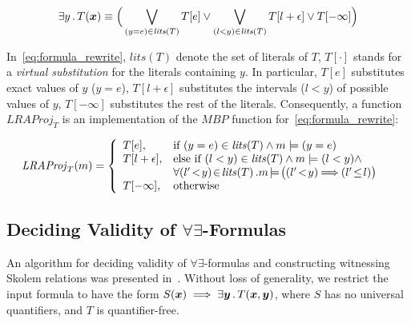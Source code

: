 \begin{equation}
  \exists y \such T (\vx) \equiv \Big( \Lor_{(y = e) \in \mathit{lits}(T)}{T[e]} \lor
  	\Lor_{(l < y) \in \mathit{lits} (T)}{T [l + \epsilon]} \lor
	T[-\infty] \Big)\label{eq:formula_rewrite}
\end{equation} 
\smallskip  

In~\eqref{eq:formula_rewrite}, $\mathit{lits}(T)$ denote the set of literals of $T$, $T[\cdot]$ stands for a \emph{virtual substitution} for the literals containing $y$.
In particular, $T[e]$ substitutes exact values of $y$ ($y=e$), $T[l+\epsilon]$ substitutes the intervals ($l < y$) of possible values of $y$, $T[-\infty]$ substitutes the rest of the literals.
Consequently, a function $\mathit{LRAProj_{T}}$ is an implementation of the $\mathit{MBP}$ function for~\eqref{eq:formula_rewrite}:

\begin{equation}
\begin{aligned}
\label{case:proj_define}
&\mathit{LRAProj}_{T}(m) = \left\{
\begin{array}{ll}
T[e], 			& \mbox{if}\ (y=e) \in \mathit{lits}(T) \land 
			m \models (y = e)\\
T[l+ \epsilon],	& \mbox{else if}\ (l < y) \in \mathit{lits}(T) 
			\land m \models (l < y) \land \\
			& \forall (l'\!<\!y)\!\in\!\mathit{lits}(T) \such \!m\!\models\!\big((l'\!<\!y)\!\!\implies\!\!(l'\! \le\! l)\big)\\
T[-\infty], 		& \mbox{otherwise}	
\end{array}
\right.
\end{aligned}
\end{equation}





\subsection{Deciding Validity of $\forall\exists$-Formulas}
\label{sim:check}

An algorithm \aeval for deciding validity of $\forall\exists$-formulas and constructing witnessing Skolem relations was presented in~\cite{fedyukovich2015automated}.
  Without loss of generality, we restrict the input formula to have the form 
${S(\vx)\implies\exists \vy \such T(\vx,\vy)}$, where
$S$ has no universal quantifiers, and $T$ is quantifier-free.


